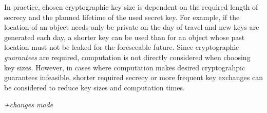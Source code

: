 \documentclass[a4paper]{scrartcl}
\newenvironment{rebuttal}{\begin{enumerate}[label={\color{grey}\thesection.\arabic{enumi}},leftmargin=0pt,ref=\thesection.\arabic{enumi}]}{\end{enumerate}}
\begin{document}
\begin{rebuttal}
In practice, chosen cryptographic key size is dependent on the required length of secrecy and the planned lifetime of the used secret key. For example, if the location of an object needs only be private on the day of travel and new keys are generated each day, a shorter key can be used than for an object whose past location must not be leaked for the foreseeable future. Since cryptographic \textit{guarantees} are required, computation is not directly considered when choosing key sizes. However, in cases where computation makes desired cryptograhpic guarantees infeasible, shorter required secrecy or more frequent key exchanges can be considered to reduce key sizes and computation times.

\textit{+changes made}


\end{rebuttal}


\end{document}
